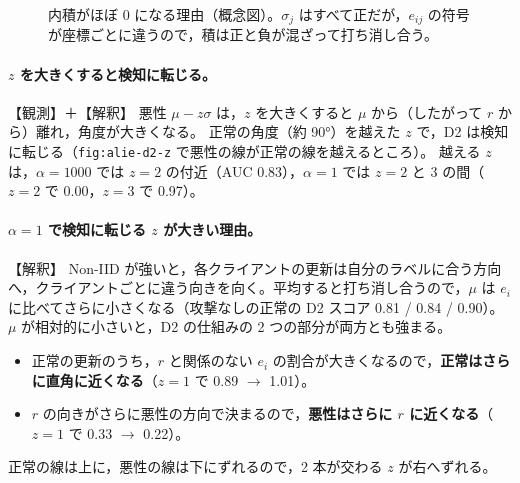 \documentclass[a4j, dvipdfmx]{jsarticle}  %
\begin{document}
\begin{figure}[H]
\centering
{}
\caption{内積がほぼ 0 になる理由（概念図）。$\sigma_j$ はすべて正だが，$e_{ij}$ の符号が座標ごとに違うので，積は正と負が混ざって打ち消し合う。}
\label{fig:alie-cov}
\end{figure}

\paragraph{$z$ を大きくすると検知に転じる。}【観測】＋【解釈】
悪性 $\mu - z\sigma$ は，$z$ を大きくすると $\mu$ から（したがって $r$ から）離れ，角度が大きくなる。
正常の角度（約 90°）を越えた $z$ で，D2 は検知に転じる（\texttt{fig:alie-d2-z} で悪性の線が正常の線を越えるところ）。
越える $z$ は，$\alpha = 1000$ では $z = 2$ の付近（AUC 0.83），$\alpha = 1$ では $z = 2$ と 3 の間（$z = 2$ で 0.00，$z = 3$ で 0.97）。

\paragraph{$\alpha = 1$ で検知に転じる $z$ が大きい理由。}【解釈】
Non-IID が強いと，各クライアントの更新は自分のラベルに合う方向へ，クライアントごとに違う向きを向く。平均すると打ち消し合うので，$\mu$ は $e_i$ に比べてさらに小さくなる（攻撃なしの正常の D2 スコア 0.81 / 0.84 / 0.90）。
$\mu$ が相対的に小さいと，D2 の仕組みの 2 つの部分が両方とも強まる。
\begin{itemize}
  \item 正常の更新のうち，$r$ と関係のない $e_i$ の割合が大きくなるので，\textbf{正常はさらに直角に近くなる}（$z = 1$ で 0.89 $\rightarrow$ 1.01）。
  \item $r$ の向きがさらに悪性の方向で決まるので，\textbf{悪性はさらに $r$ に近くなる}（$z = 1$ で 0.33 $\rightarrow$ 0.22）。
\end{itemize}
正常の線は上に，悪性の線は下にずれるので，2 本が交わる $z$ が右へずれる。
\end{document}
